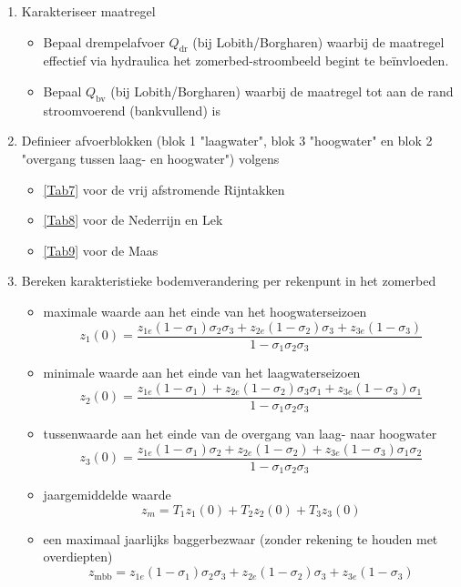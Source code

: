 \begin{enumerate}
\item Karakteriseer maatregel

\begin{itemize}
\item Bepaal drempelafvoer $Q_\text{dr}$ (bij Lobith/Borgharen) waarbij de maatregel effectief via hydraulica het zomerbed-stroombeeld begint te be\"invloeden.

\item Bepaal $Q_\text{bv}$ (bij Lobith/Borgharen) waarbij de maatregel tot aan de rand stroomvoerend (bankvullend) is
\end{itemize}

\item Definieer afvoerblokken (blok 1 "laagwater", blok 3 "hoogwater" en blok 2 "overgang tussen laag- en hoogwater") volgens

\begin{itemize}
\item \autoref{Tab7} voor de vrij afstromende Rijntakken
\item \autoref{Tab8} voor de Nederrijn en Lek
\item \autoref{Tab9} voor de Maas
\end{itemize}

\item Bereken karakteristieke bodemverandering per rekenpunt in het zomerbed

\begin{itemize}
\item maximale waarde  aan het einde van het hoogwaterseizoen
%
\begin{equation}
z_1(0) = \frac{z_{1e} (1-\sigma_1) \sigma_2 \sigma_3 + z_{2e} (1-\sigma_2) \sigma_3 + z_{3e} (1-\sigma_3)}{1 - \sigma_1 \sigma_2 \sigma_3}
\end{equation}
\item minimale waarde  aan het einde van het laagwaterseizoen
%
\begin{equation}
z_2(0) = \frac{z_{1e} (1-\sigma_1) + z_{2e} (1-\sigma_2) \sigma_3 \sigma_1 + z_{3e} (1-\sigma_3) \sigma_1}{1 - \sigma_1 \sigma_2 \sigma_3}
\end{equation}
\item tussenwaarde  aan het einde van de overgang van laag- naar hoogwater
%
\begin{equation}
z_3(0) = \frac{z_{1e} (1-\sigma_1) \sigma_2 + z_{2e} (1-\sigma_2) + z_{3e} (1-\sigma_3) \sigma_1 \sigma_2}{1 - \sigma_1 \sigma_2 \sigma_3}
\end{equation}
\item jaargemiddelde waarde 
%
\begin{equation}
z_m = T_1 z_1(0) + T_2 z_2(0) + T_3 z_3(0)
\end{equation}
\item een maximaal jaarlijks baggerbezwaar (zonder rekening te houden met overdiepten)
%
\begin{equation}
z_\text{mbb} = z_{1e} (1-\sigma_1) \sigma_2 \sigma_3 + z_{2e} (1-\sigma_2) \sigma_3 + z_{3e} (1-\sigma_3)
\end{equation}
\end{itemize}


\end{enumerate}
